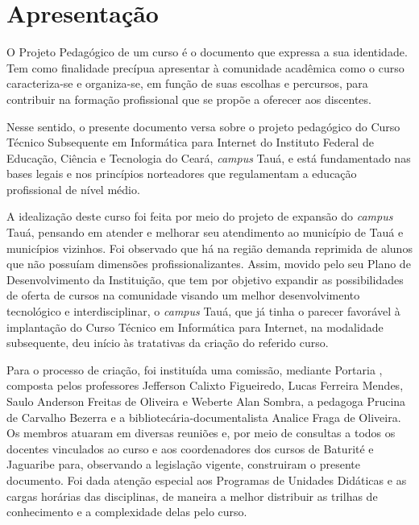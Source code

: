 
\chapter{Apresentação}


%  
 
 O Projeto Pedagógico de um curso é o documento que expressa a sua identidade.
 Tem como finalidade precípua apresentar à comunidade acadêmica como o curso
 caracteriza-se e organiza-se, em função de suas escolhas e percursos, para
 contribuir na formação profissional que se propõe a oferecer aos discentes.
 
 Nesse sentido, o presente documento versa sobre o projeto pedagógico do Curso
 Técnico Subsequente em Informática para Internet do Instituto Federal de
 Educação, Ciência e Tecnologia do Ceará, \textit{campus} Tauá, e está
 fundamentado nas bases legais e nos princípios norteadores que regulamentam a
 educação profissional de nível médio.
 
 
 A idealização deste curso foi feita por meio do projeto de expansão do
 \textit{campus} Tauá, pensando em atender e melhorar seu atendimento ao município
 de Tauá e municípios vizinhos. 
 Foi observado que há na região demanda reprimida de alunos que
 não possuíam dimensões profissionalizantes. Assim, movido pelo seu Plano de Desenvolvimento da Instituição, que tem por
 objetivo expandir as possibilidades de oferta de cursos na comunidade visando
 um melhor desenvolvimento tecnológico e interdisciplinar, o \textit{campus} Tauá, que já tinha o parecer favorável à implantação 
 do Curso Técnico em Informática para Internet, na modalidade subsequente, deu início às tratativas da criação do referido curso.
 
 
 Para o processo de criação, foi instituída uma comissão, mediante
 Portaria , composta pelos professores
 Jefferson Calixto Figueiredo, Lucas Ferreira Mendes, Saulo Anderson Freitas de
 Oliveira e Weberte Alan Sombra, a pedagoga Prucina de Carvalho Bezerra
 e a  bibliotecária-documentalista 
Analice Fraga de Oliveira. Os membros atuaram
 em diversas reuniões e, por meio de consultas a todos os docentes vinculados
 ao curso e aos coordenadores dos cursos de Baturité e Jaguaribe  para, observando a legislação vigente, construiram o
 presente documento. Foi dada atenção especial aos Programas de Unidades Didáticas
 e as cargas horárias das disciplinas, de maneira a melhor distribuir as trilhas de conhecimento e a complexidade
 delas pelo curso.
 
